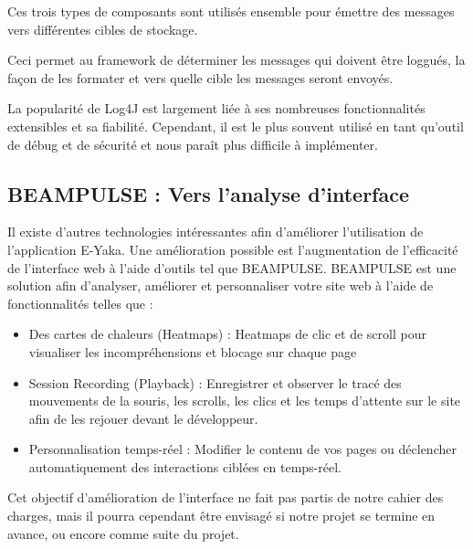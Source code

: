 	Ces trois types de composants sont utilisés ensemble pour émettre des messages vers différentes cibles de stockage.

	Ceci permet au framework de déterminer les messages qui doivent être loggués, la façon de les formater et vers quelle cible les messages seront envoyés.

	La popularité de Log4J est largement liée à  ses nombreuses fonctionnalités extensibles et sa fiabilité. Cependant, il est le plus souvent utilisé en tant qu'outil de débug et de sécurité et nous paraît plus difficile à implémenter.
	
	\subsection{BEAMPULSE : Vers l'analyse d'interface}
	
	Il existe d'autres technologies intéressantes afin d'améliorer l'utilisation de l'application E-Yaka. Une  amélioration possible est l'augmentation de l'efficacité de l'interface web à l'aide d'outils tel que BEAMPULSE. BEAMPULSE est une solution afin d'analyser, améliorer et personnaliser votre site web à l'aide de fonctionnalités telles que :
	\begin{itemize}
	\item Des cartes de chaleurs (Heatmaps) : Heatmaps de clic et de scroll pour visualiser les incompréhensions et blocage sur chaque page
	
    \item Session Recording (Playback) : Enregistrer et observer le tracé des mouvements de la souris, les scrolls, les clics et les temps d'attente sur le site afin de les rejouer devant le développeur.
    \item Personnalisation temps-réel : Modifier le contenu de vos pages ou déclencher automatiquement des interactions ciblées en temps-réel.

\end{itemize}
	
	Cet objectif d'amélioration de l'interface ne fait pas partis de notre cahier des charges, mais il pourra cependant être envisagé si notre projet se termine en avance, ou encore comme suite du projet.
	 
